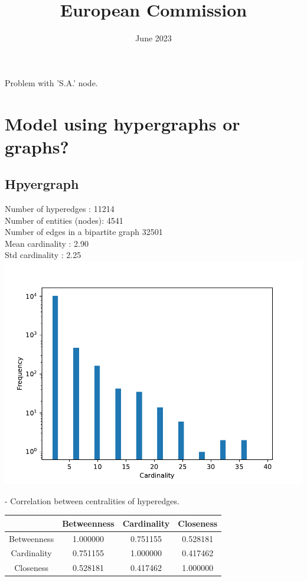 \documentclass[ 11pt]{article}
\title{European Commission}
\author{}
\date{June 2023}
\begin{document}
\maketitle

Problem with 'S.A.' node. 
\section{Model using hypergraphs or graphs?}

\subsection{Hpyergraph}
Number of hyperedges : 11214\\
Number of entities (nodes): 4541\\
Number of edges in a bipartite graph 32501 \\
Mean cardinality : 2.90\\
Std cardinality : 2.25\\
 \includegraphics[scale=0.5]{../Programs/Figures/hist_Cardinality.pdf}

- Correlation between centralities of hyperedges.\\

\begin{tabular}{|c|ccc|}
\hline
			&Betweenness  &Cardinality  &Closeness \\
			\hline
Betweenness     &1.000000     &0.751155  & 0.528181 \\
Cardinality     &0.751155     &1.000000  & 0.417462 \\
Closeness       &0.528181    &0.417462  & 1.000000 \\
\hline
\end{tabular}  \\
\end{document}

